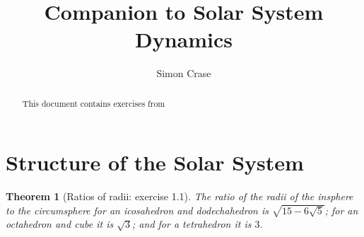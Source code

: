 \documentclass[]{article}
\title{Companion to Solar System Dynamics}
\author{Simon Crase}
\newtheorem{theorem}{Theorem}[section]
\begin{document}
\maketitle
\tableofcontents
\listoffigures
\listoftheorems[title=List of Theorems]
\begin{abstract}
This document contains exercises from \cite{ssd}
\end{abstract}

\section{Structure of the Solar System}

\begin{theorem}[Ratios of radii: exercise 1.1]
	The ratio of the radii of the insphere to the circumsphere for an icosahedron and dodechahedron is $\sqrt{15-6\sqrt{5}}$; for an octahedron and cube it is $\sqrt{3}$; and for a tetrahedron it is $3$.
\end{theorem}
\end{document}
